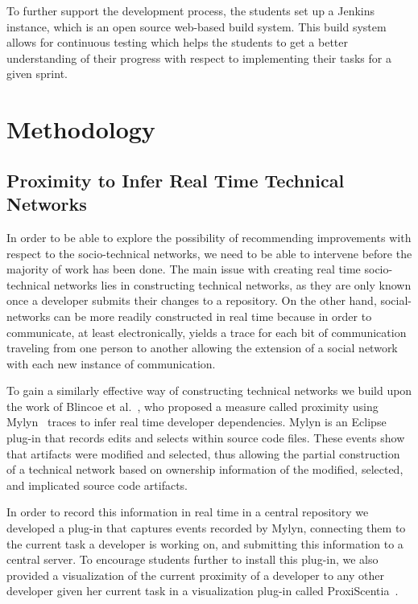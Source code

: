 To further support the development process, the students set up a Jenkins instance, which is an open source web-based build system.
This build system allows for continuous testing which helps the students to get a better understanding of their progress with respect to implementing their tasks for a given sprint.

\section{Methodology}
\label{ch10:meth}
\subsection{Proximity to Infer Real Time Technical Networks}
\label{chap:making:subset:proximity}
In order to be able to explore the possibility of recommending improvements with respect to the socio-technical networks, we need to be able to intervene before the majority of work has been done.
The main issue with creating real time socio-technical networks lies in constructing technical networks, as they are only known once a developer submits their changes to a repository.
On the other hand, social-networks can be more readily constructed in real time because in order to communicate, at least electronically, yields a trace for each bit of communication traveling from one person to another allowing the extension of a social network with each new instance of communication.

To gain a similarly effective way of constructing technical networks we build upon the work of Blincoe et al.~\cite{blincoe:cscw:2012}, who proposed a measure called proximity using Mylyn~\cite{kersten:aosd:2005} traces to infer real time developer dependencies.
Mylyn is an Eclipse plug-in that records edits and selects within source code files.
These events show that artifacts were modified and selected, thus allowing the partial construction of a technical network based on ownership information of the modified, selected, and implicated source code artifacts.

In order to record this information in real time in a central repository we developed a plug-in that captures events recorded by Mylyn, connecting them to the current task a developer is working on, and submitting this information to a central server. 
To encourage students further to install this plug-in, we also provided a visualization of the current proximity of a developer to any other developer given her current task in a visualization plug-in called ProxiScentia~\cite{borici:chase:2012}.

